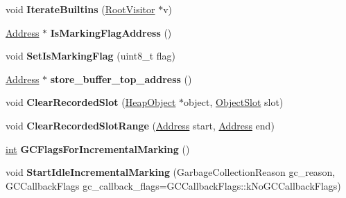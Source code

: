 \begin{DoxyCompactItemize}
\item 
\mbox{\label{classv8_1_1internal_1_1Heap_a9b3ee09264062c19cd1a54590f67779b}} 
void {\bfseries Iterate\+Builtins} (\mbox{\hyperlink{classv8_1_1internal_1_1RootVisitor}{Root\+Visitor}} $\ast$v)
\item 
\mbox{\label{classv8_1_1internal_1_1Heap_ae106a70408e8888ac8971a2064620f37}} 
\mbox{\hyperlink{classuintptr__t}{Address}} $\ast$ {\bfseries Is\+Marking\+Flag\+Address} ()
\item 
\mbox{\label{classv8_1_1internal_1_1Heap_a7bf7dd29d037b2dae90b2987be1904f3}} 
void {\bfseries Set\+Is\+Marking\+Flag} (uint8\+\_\+t flag)
\item 
\mbox{\label{classv8_1_1internal_1_1Heap_a27b17b4ad8fdaa91e4922675f5c96b31}} 
\mbox{\hyperlink{classuintptr__t}{Address}} $\ast$ {\bfseries store\+\_\+buffer\+\_\+top\+\_\+address} ()
\item 
\mbox{\label{classv8_1_1internal_1_1Heap_a50359d8e1b4f1d9f39386ae1ed8edd68}} 
void {\bfseries Clear\+Recorded\+Slot} (\mbox{\hyperlink{classv8_1_1internal_1_1HeapObject}{Heap\+Object}} $\ast$object, \mbox{\hyperlink{classv8_1_1internal_1_1ObjectSlot}{Object\+Slot}} slot)
\item 
\mbox{\label{classv8_1_1internal_1_1Heap_a1f8f30732064e29aad0b9e9175998a81}} 
void {\bfseries Clear\+Recorded\+Slot\+Range} (\mbox{\hyperlink{classuintptr__t}{Address}} start, \mbox{\hyperlink{classuintptr__t}{Address}} end)
\item 
\mbox{\label{classv8_1_1internal_1_1Heap_abdd2e38b4babe4ea85cde6bb9c19877e}} 
\mbox{\hyperlink{classint}{int}} {\bfseries G\+C\+Flags\+For\+Incremental\+Marking} ()
\item 
\mbox{\label{classv8_1_1internal_1_1Heap_a66fc0f7c9aebbc99b77ff9dd3d22d7b4}} 
void {\bfseries Start\+Idle\+Incremental\+Marking} (Garbage\+Collection\+Reason gc\+\_\+reason, G\+C\+Callback\+Flags gc\+\_\+callback\+\_\+flags=G\+C\+Callback\+Flags\+::k\+No\+G\+C\+Callback\+Flags)

\end{DoxyCompactItemize}
